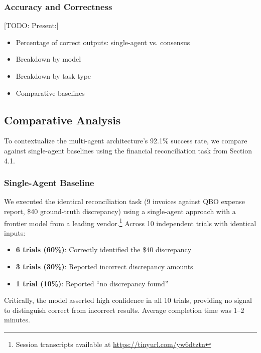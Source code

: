 \documentclass[sigconf]{acmart}
\newcommand{\reviewnote}[1]{}
\newcommand{\reviewnote}[1]{\marginnote{\raggedright\footnotesize\textit{#1}}}
\begin{document}
\ifdefined\isrelease
\else
  \subsubsection{Accuracy and Correctness}
  \reviewnote{IMPORTANT: This section must be filled in. Show: (1) Baseline single-agent accuracy on 522 sessions (need counterfactual), (2) Accuracy breakdown by model provider, (3) Accuracy by task complexity. Without this, you cannot claim "92.1\% improvement."}
  {[}TODO: Present:{]}
  \begin{itemize}
    \item Percentage of correct outputs: single-agent vs. consensus
    \item Breakdown by model
    \item Breakdown by task type
    \item Comparative baselines
  \end{itemize}
\fi

\subsection{Comparative Analysis}
\label{sec:comparative}

To contextualize the multi-agent architecture's 92.1\% success rate, we compare against single-agent baselines using the financial reconciliation task from Section 4.1.

\subsubsection{Single-Agent Baseline}

We executed the identical reconciliation task (9 invoices against QBO expense report, \$40 ground-truth discrepancy) using a single-agent approach with a frontier model from a leading vendor.\footnote{Session transcripts available at \url{https://tinyurl.com/yw6dtztn}} Across 10 independent trials with identical inputs:

\begin{itemize}
  \item \textbf{6 trials (60\%)}: Correctly identified the \$40 discrepancy
  \item \textbf{3 trials (30\%)}: Reported incorrect discrepancy amounts
  \item \textbf{1 trial (10\%)}: Reported ``no discrepancy found''
\end{itemize}

Critically, the model asserted high confidence in all 10 trials, providing no signal to distinguish correct from incorrect results. Average completion time was 1--2 minutes.
\end{document}
